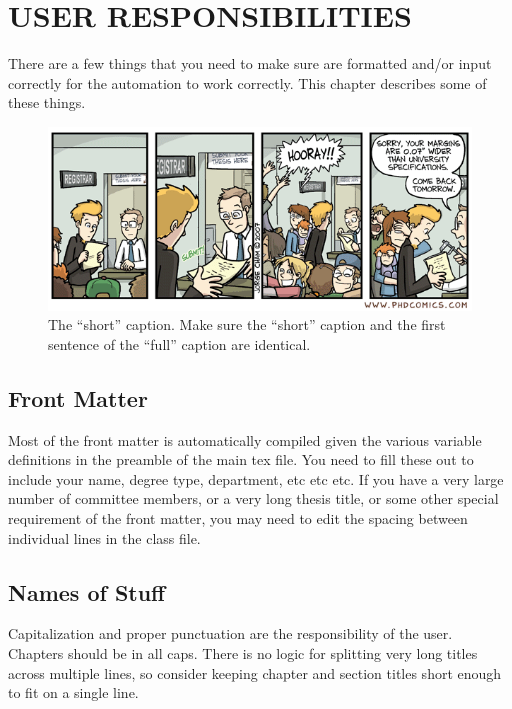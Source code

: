
\chapter{USER RESPONSIBILITIES} \label{chapter:userresponsibilities}

There are a few things that you need to make sure are formatted and/or input correctly for the automation to work correctly.
 This chapter describes some of these things.

\begin{figure}
    \includegraphics[width=\textwidth]{static/phdcomics}
    \caption[
        The ``short'' caption.
    ]{
        The ``short'' caption.
        Make sure the ``short'' caption and the first sentence of the ``full'' caption are identical.
    }
    \label{fig:phdcomics}
\end{figure}

\section{Front Matter}

Most of the front matter is automatically compiled given the various variable definitions in the preamble of the main tex file.
 You need to fill these out to include your name, degree type, department, etc etc etc.
 If you have a very large number of committee members, or a very long thesis title, or some other special requirement of the front matter, you may need to edit the spacing between individual lines in the class file.

\section{Names of Stuff}

Capitalization and proper punctuation are the responsibility of the user.
 Chapters should be in all caps.
 There is no logic for splitting very long titles across multiple lines, so consider keeping chapter and section titles short enough to fit on a single line.

